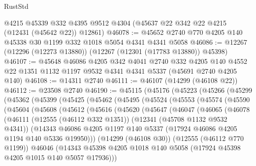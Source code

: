 \begin{lexlean}{RustStd}
\begin{coremodule}
    @4215
    @45339
    @332
    @4395
    @9512
    @4304
    (@45637 @22 @342 @22 @4215 (@12431 (@45642 @22)) @12861)
@46078 := @45652 @2740 @770 @4205 @140 @45338 @30 @1199 @332 @1018 @5054 @4341 @4341 @5058
@46086 := @12267 (@12296 (@12273 @13880)) (@12267 (@12301 (@17783 @13880)) @45398)
@46107 := @45648
    @46086
    @4205
    @342
    @4041
    @2740
    @332
    @4205
    @140
    @4552
    @22
    @1351
    @1132
    @1197
    @9532
    @4341
    @4341
    @5337
    (@45691 @2740 @4205 @140)
@46108 := @14311 @2740
@46111 := @46107 (@14299 (@46108 @22))
@46112 := @23508 @2740
@46190 := @45115
    (@45176
      (@45223
        (@45266
          (@45299
            (@45362
              (@45399
                (@45425
                  (@45462
                    (@45495
                      (@45524
                        (@45553
                          (@45574
                            (@45590
                              (@45604
                                (@45608
                                  (@45612
                                    (@45616
                                      (@45620
                                        (@45647
                                          (@46047
                                            (@46065
                                              (@46078
                                                (@46111
                                                  (@12555 (@46112 @332 @1351))
                                                  (@12341 (@45708 @1132 @9532 @4341))
                                                  (@14343
                                                    @46086
                                                    @4205
                                                    @1197
                                                    @140
                                                    @5337
                                                    (@17924 @46086 @4205 @1194 @140 @5336 @19950)))
                                                (@14299 (@46108 @30))
                                                (@12555 (@46112 @770 @1199))
                                                @46046
                                                (@14343
                                                  @45398
                                                  @4205
                                                  @1018
                                                  @140
                                                  @5058
                                                  (@17924 @45398 @4205 @1015 @140 @5057 @17936)))

\end{coremodule}
\end{lexlean}
